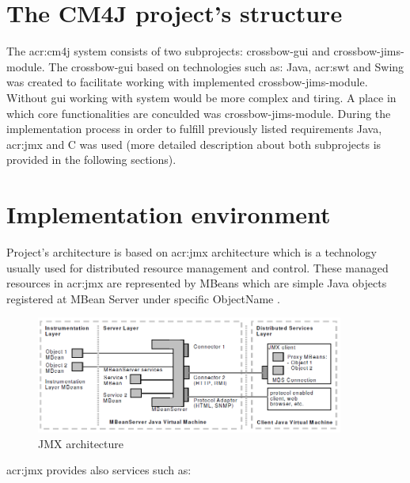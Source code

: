 \documentclass[11pt,openany]{book}
\begin{document}
    \section{The CM4J project's structure}
    \label{sec:impl:structure}

	The \gls{acr:cm4j} system consists of two subprojects: crossbow-gui and crossbow-jims-module. The crossbow-gui  
	based on technologies such as: Java, \gls{acr:swt} and Swing was created to facilitate working with implemented crossbow-jims-module.
	Without gui working with system would be more complex and tiring. A place in which core functionalities are conculded was crossbow-jims-module. 
	During the implementation process in order to fulfill previously listed requirements Java, \gls{acr:jmx}  and C was used 
	(more detailed description about both subprojects is provided in the following sections).

    \section{Implementation environment}
    \label{sec:impl:env}

      Project's architecture is based on \gls{acr:jmx} architecture which is a technology usually used for distributed resource
      management and control. These managed resources in \gls{acr:jmx} are represented by MBeans which are simple Java objects
      registered at MBean Server under specific ObjectName \cite{jims}.
    
      \begin{figure}[H]
        \begin{center}
          \includegraphics[width=0.9\textwidth]{img/jims/jmx.png}
        \end{center}


        \caption{JMX architecture \cite{jims}}
      \end{figure}
	
      \gls{acr:jmx} provides also services such as:
\end{document}
